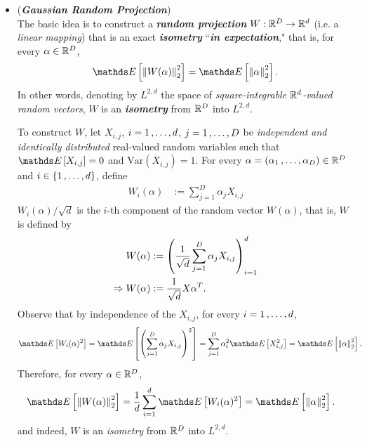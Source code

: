 \documentclass[11pt]{article}
\begin{document}
\begin{itemize}
\item \begin{remark} (\emph{\textbf{Gaussian Random Projection}})\\
The basic idea is to construct a \emph{\textbf{random projection}} $W : {\mathbb R}^D \to {\mathbb R}^d$ (i.e. a \emph{linear mapping}) that is an exact \emph{\textbf{isometry}} ``\emph{\textbf{in expectation}}," that is, for every $\alpha \in {\mathbb R}^D$,
\begin{align*}
\E{}{\norm{W(\alpha)}{2}^2} = \E{}{\norm{\alpha}{2}^2}.
\end{align*} In other words, denoting by $L^{2,d}$ the space of \emph{square-integrable ${\mathbb R}^d$-valued random vectors}, $W$ is an \emph{\textbf{isometry}} from ${\mathbb R}^D$ into $L^{2,d}$.

To construct $W$, let $X_{i,j}$, $i = 1 \,{,}\ldots{,}\, d$,  $j = 1 \,{,}\ldots{,}\, D$ be \emph{independent and identically distributed} real-valued random variables such that $\E{}{X_{i,j}} = 0$ and $\text{Var}(X_{i,j}) = 1$. For every $\alpha = (\alpha_1 \,{,}\ldots{,}\, \alpha_D) \in {\mathbb R}^D$ and $i \in \left\{1 \,{,}\ldots{,}\, d\right\}$, define
\begin{align*}
W_i(\alpha)  &:= \sum_{j=1}^{D}\alpha_{j}X_{i,j} 
\end{align*} $W_i(\alpha)/\sqrt{d}$ is the $i$-th component of the random vector $W(\alpha)$, that is, $W$ is defined by
\begin{align*}
W(\alpha) &:= \left(\frac{1}{\sqrt{d}}\sum_{j=1}^{D}\alpha_{j}X_{i,j}\right)_{i=1}^{d} \\
\Rightarrow  W(\alpha) &:= \frac{1}{\sqrt{d}} X \alpha^{T}.
\end{align*} Observe that by independence of the $X_{i,j}$, for every $i = 1 \,{,}\ldots{,}\, d$,  
\begin{align*}
\E{}{W_i(\alpha)^2} &= \E{}{\paren{\sum_{j=1}^{D}\alpha_{j}X_{i,j} }^2} = \sum_{j=1}^{D}\alpha_i^2\E{}{X_{i,j}^2} = \E{}{\norm{\alpha}{2}^2}.
\end{align*} Therefore, for every $\alpha \in {\mathbb R}^D$,
\begin{align*}
\E{}{\norm{W(\alpha)}{2}^2} &= \frac{1}{d}\sum_{i=1}^d\E{}{W_i(\alpha)^2} =  \E{}{\norm{\alpha}{2}^2}.
\end{align*} and indeed, $W$ is an \emph{isometry} from ${\mathbb R}^D$ into $L^{2,d}$.
\end{remark}


\end{itemize}
\end{document}
